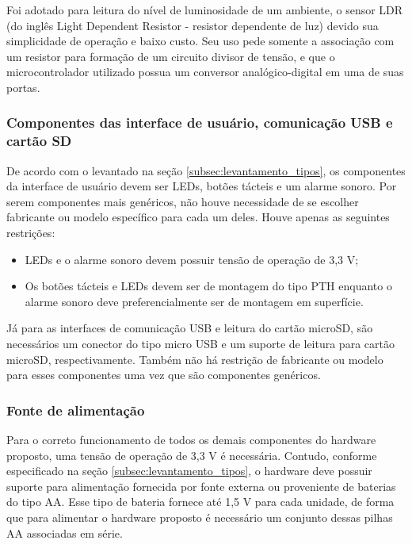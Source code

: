 Foi adotado para leitura do nível de luminosidade de um ambiente, o sensor LDR (do inglês Light Dependent Resistor - resistor dependente de luz) devido sua simplicidade de operação e baixo custo. Seu uso pede somente a associação com um resistor para formação de um circuito divisor de tensão, e que o microcontrolador utilizado possua um conversor analógico-digital em uma de suas portas. 





\subsubsection{Componentes das interface de usuário, comunicação USB e cartão SD}

De acordo com o levantado na seção \ref{subsec:levantamento_tipos}, os componentes da interface de usuário devem ser LEDs, botões tácteis e um alarme sonoro. Por serem componentes mais genéricos, não houve necessidade de se escolher fabricante ou modelo específico para cada um deles. Houve apenas as seguintes restrições: 

\begin{itemize}
    \item LEDs e o alarme sonoro devem possuir tensão de operação de 3,3 V;
    \item Os botões tácteis e LEDs devem ser de montagem do tipo PTH enquanto o alarme sonoro deve preferencialmente ser de montagem em superfície.
\end{itemize}

Já para as interfaces de comunicação USB e leitura do cartão microSD, são necessários um conector do tipo micro USB e um suporte de leitura para cartão microSD, respectivamente. Também não há restrição de fabricante ou modelo para esses componentes uma vez que são componentes genéricos. 


\subsubsection{Fonte de alimentação}

Para o correto funcionamento de todos os demais componentes do hardware proposto, uma tensão de operação de 3,3 V é necessária. Contudo, conforme especificado na seção \ref{subsec:levantamento_tipos}, o hardware deve possuir suporte para alimentação fornecida por fonte externa ou proveniente de baterias do tipo AA. Esse tipo de bateria fornece até 1,5 V para cada unidade, de forma que para alimentar o hardware proposto é necessário um conjunto dessas pilhas AA associadas em série.

